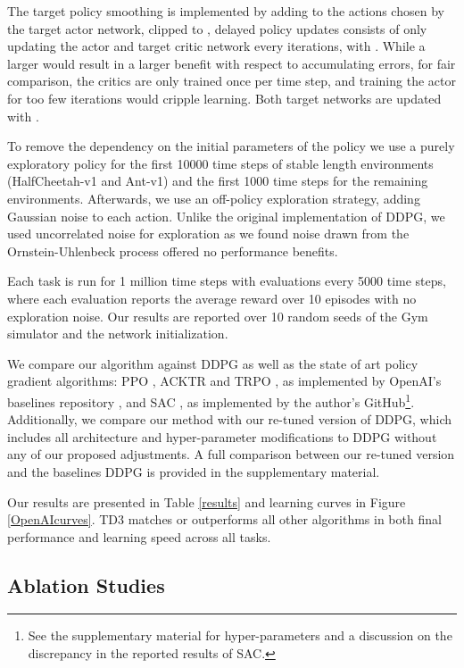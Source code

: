\documentclass{article}
\begin{document}
The target policy smoothing is implemented by adding  to the actions chosen by the target actor network, clipped to , delayed policy updates consists of only updating the actor and target critic network every  iterations, with . While a larger  would result in a larger benefit with respect to accumulating errors, for fair comparison, the critics are only trained once per time step, and training the actor for too few iterations would cripple learning. Both target networks are updated with . 

To remove the dependency on the initial parameters of the policy we use a purely exploratory policy for the first 10000 time steps of stable length environments (HalfCheetah-v1 and Ant-v1) and the first 1000 time steps for the remaining environments. Afterwards, we use an off-policy exploration strategy, adding Gaussian noise  to each action. Unlike the original implementation of DDPG, we used uncorrelated noise for exploration as we found noise drawn from the Ornstein-Uhlenbeck \cite{uhlenbeck1930theory} process offered no performance benefits.

Each task is run for 1 million time steps with evaluations every 5000 time steps, where each evaluation reports the average reward over 10 episodes with no exploration noise. Our results are reported over 10 random seeds of the Gym simulator and the network initialization. 

We compare our algorithm against DDPG \cite{DDPG} as well as the state of art policy gradient algorithms: PPO \cite{ppo}, ACKTR \cite{acktr} and TRPO \cite{trpo}, as implemented by OpenAI's baselines repository \cite{baselines}, and SAC \cite{haarnoja2018soft}, as implemented by the author's GitHub\footnote{See the supplementary material for hyper-parameters and a discussion on the discrepancy in the reported results of SAC.}. 
Additionally, we compare our method with our re-tuned version of DDPG, which includes all architecture and hyper-parameter modifications to DDPG without any of our proposed adjustments. 
A full comparison between our re-tuned version and the baselines DDPG is provided in the supplementary material.

Our results are presented in Table \ref{results} and learning curves in Figure \ref{OpenAIcurves}. TD3 matches or outperforms all other algorithms in both final performance and learning speed across all tasks. 

\subsection{Ablation Studies}
\end{document}
